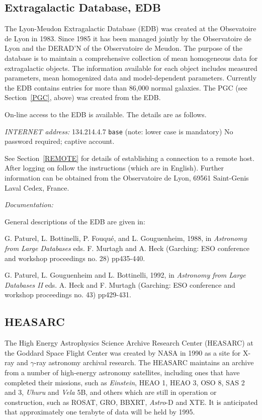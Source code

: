 \documentclass[twoside,11pt]{article}
\newcommand{\xlabel}[1]{}
\begin{document}
\subsection{Extragalactic Database, EDB
\xlabel{extragalactic_database_edb}\label{EDB}}

The Lyon-Meudon Extragalactic Database (EDB) was created at the
Obsevatoire de Lyon in 1983. Since 1985 it has been managed jointly by
the Observatoire de Lyon and the DERAD'N of the Observatoire de Meudon.
The purpose of the database is to maintain a comprehensive collection
of mean homogeneous data for extragalactic objects. The information
available for each object includes measured parameters, mean homogenized
data and model-dependent parameters. Currently the EDB contains entries
for more than 86,000 normal galaxies. The PGC (see Section~\ref{PGC},
above) was created from the EDB.

On-line access to the EDB is available. The details are as follows.

{\it INTERNET address:} 134.214.4.7
 \verb-base- (note: lower case is mandatory)
 No password required; captive account.

See Section~\ref{REMOTE} for details of establishing a connection to
a remote host. After logging on follow the instructions (which are in
English). Further information can be obtained from the Observatoire de
Lyon, 69561 Saint-Genis Laval Cedex, France.

{\it Documentation:}

General descriptions of the EDB are given in:

G. Paturel, L. Bottinelli, P. Fouqu\'{e}, and L. Gouguenheim, 1988, in
{\it Astronomy from Large Databases} eds. F. Murtagh and A. Heck
(Garching: ESO conference and workshop proceedings no. 28) pp435-440.

G. Paturel, L. Gouguenheim and L. Bottinelli, 1992, in
{\it Astronomy from Large Databases II} eds. A. Heck and F. Murtagh
(Garching: ESO conference and workshop proceedings no. 43) pp429-431.

\subsection{HEASARC
\xlabel{heasarc}\label{HEASARC}}

The High Energy Astrophysics Science Archive Research Center (HEASARC)
at the Goddard Space Flight Center was created by NASA in 1990 as a site
for X-ray and $\gamma$-ray astronomy archival research. The HEASARC
maintains an archive from a number of high-energy astronomy satellites,
including ones that have completed their missions, such as {\it
Einstein}, HEAO 1, HEAO 3, OSO 8, SAS 2 and 3, {\it Uhuru} and {\it
Vela} 5B, and others which are still in operation or construction, such
as ROSAT, GRO, BBXRT, {\it Astro}-D and XTE. It is anticipated that
approximately one terabyte of data will be held by 1995.
\end{document}
